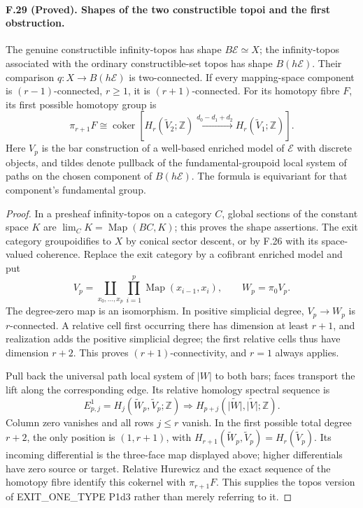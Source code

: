 \paragraph{F.29 (Proved). Shapes of the two constructible topoi and
the first obstruction.}
The genuine constructible infinity-topos has shape
$B\mathcal E\simeq X$; the infinity-topos associated with the
ordinary constructible-set topos has shape $B(h\mathcal E)$.
Their comparison
$q:X\to B(h\mathcal E)$ is two-connected. If every mapping-space
component is $(r-1)$-connected, $r\geq1$, it is $(r+1)$-connected.
For its homotopy fibre $F$, its first possible homotopy group is
\[
 \pi_{r+1}F\cong
 \operatorname{coker}\left[
 H_r(\widetilde V_2;\mathbb Z)
 \xrightarrow{d_0-d_1+d_2}H_r(\widetilde V_1;\mathbb Z)\right].
\]
Here $V_p$ is the bar construction of a well-based enriched model
of $\mathcal E$ with discrete objects, and tildes denote pullback of
the fundamental-groupoid local system of paths on the chosen
component of $B(h\mathcal E)$. The formula is equivariant for that
component's fundamental group.

\begin{proof}
In a presheaf infinity-topos on a category $C$, global sections of
the constant space $K$ are $\lim_CK=\operatorname{Map}(BC,K)$;
this proves the shape assertions. The exit category groupoidifies to
$X$ by conical sector descent, or by F.26 with its space-valued
coherence. Replace the exit category by a cofibrant enriched model
and put
\[
 V_p=\coprod_{x_0,\ldots,x_p}
 \prod_{i=1}^p\operatorname{Map}(x_{i-1},x_i),\qquad W_p=\pi_0V_p.
\]
The degree-zero map is an isomorphism. In positive simplicial degree,
$V_p\to W_p$ is $r$-connected. A relative cell first occurring there
has dimension at least $r+1$, and realization adds the positive
simplicial degree; the first relative cells thus have dimension
$r+2$. This proves $(r+1)$-connectivity, and $r=1$ always applies.

Pull back the universal path local system of $|W|$ to both bars;
faces transport the lift along the corresponding edge. Its relative
homology spectral sequence is
\[
 E^1_{p,j}=H_j(\widetilde W_p,\widetilde V_p;\mathbb Z)
 \Longrightarrow H_{p+j}(\widetilde{|W|},\widetilde{|V|};\mathbb Z).
\]
Column zero vanishes and all rows $j\leq r$ vanish. In the first
possible total degree $r+2$, the only position is $(1,r+1)$,
with $H_{r+1}(\widetilde W_p,\widetilde V_p)=H_r(\widetilde V_p)$.
Its incoming differential is the three-face map displayed above;
higher differentials have zero source or target. Relative Hurewicz
and the exact sequence of the homotopy fibre identify this cokernel
with $\pi_{r+1}F$. This supplies the topos version of
EXIT\_ONE\_TYPE P1d3 rather than merely referring to it.
\end{proof}

